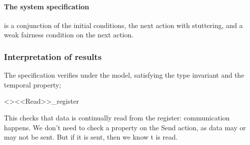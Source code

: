 \documentclass[12pt]{article}
\begin{document}
\paragraph{The system specification} is a conjunction of the initial
conditions, the next action with stuttering, and a weak fairness condition on
the next action.

\subsubsection{Interpretation of results}
The specification verifies under the model, satisfying the type invariant and
the temporal property;
\begin{tla}
	[]<><<Read>>_register
\end{tla}
\begin{tlatex}
%
\end{tlatex}
This checks that data is continually read from the register: communication
happens.  We don't need to check a property on the Send action, as data may or
may not be sent.  But if it is sent, then we know t is read.
\end{document}
